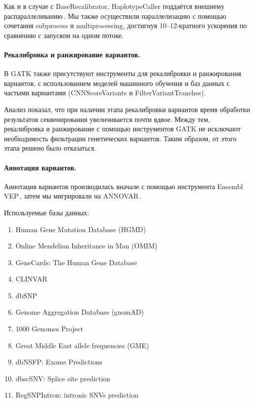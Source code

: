 \documentclass[a4paper,14pt]{extarticle}
\begin{document}
Как и в случае с BaseRecalibrator, HaplotypeCaller поддаётся внешнему распараллеливанию\,\cite{Heldenbrand_2019}.
Мы также осуществили параллелизацию с помощью сочетания subprocess и multiprocessing, достигнув 10--12-кратного ускорения по сравнению с запуском на одном потоке.

\paragraph{Рекалибровка и ранжирование вариантов.}
В GATK также присутствуют инструменты для рекалибровки и ранжирования вариантов, с использованием моделей машинного обучения и баз данных с частыми вариантами (CNNScoreVariants и FilterVariantTranches).

Анализ показал, что при наличии этапа рекалибровки вариантов время обработки результатов секвенирования увеличивается почти вдвое.
Между тем, рекалибровка и ранжирование с помощью инструментов GATK не исключают необходимость фильтрации генетических вариантов.
Таким образом, от этого этапа решено было отказаться.

\paragraph{Аннотация вариантов.}
Аннотация вариантов производилась вначале с помощью инструмента Ensembl VEP\,\cite{McLaren_2016}, затем мы мигрировали на ANNOVAR\,\cite{Wang_2010}.

Используемые базы данных:

\begin{enumerate}
\item Human Gene Mutation Database (HGMD\textregistered)\,\cite{Stenson_2017}
\item Online Mendelian Inheritance in Man (OMIM\textregistered)\,\cite{Amberger_2014}
\item GeneCards\textregistered: The Human Gene Database\,\cite{Stelzer_2016}
\item CLINVAR\,\cite{Landrum_2017}
\item dbSNP\,\cite{Sherry_2001}
\item Genome Aggregation Database (gnomAD)\,\cite{Karczewski_2020}
\item 1000 Genomes Project\,\cite{Auton_2015}
\item Great Middle East allele frequencies (GME)\,\cite{Scott_2016}
\item dbNSFP: Exome Predictions\,\cite{Liu_2016}
\item dbscSNV: Splice site prediction\,\cite{Jian_2013}
\item RegSNPIntron: intronic SNVs prediction\,\cite{Lin_2019}
\end{enumerate}
\end{document}
